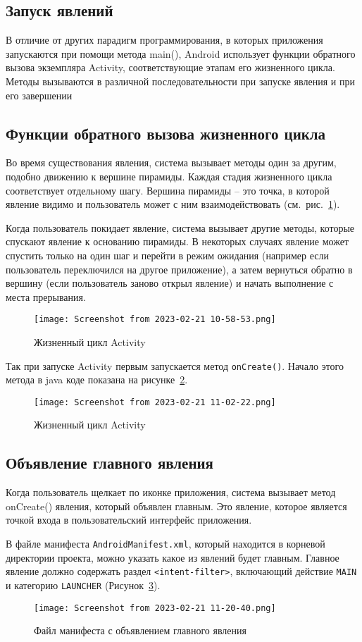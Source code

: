 \subsection{Запуск явлений}
В отличие от других парадигм программирования, в которых приложения
запускаются при помощи метода main(), Android использует функции
обратного вызова экземпляра Activity, соответствующие этапам его
жизненного цикла. Методы вызываются в различной последовательности при
запуске явления и при его завершении

\subsection{Функции обратного вызова жизненного цикла}
Во время существования явления, система вызывает методы один за другим,
подобно движению к вершине пирамиды. Каждая стадия жизненного цикла
соответствует отдельному шагу. Вершина пирамиды – это точка, в которой
явление видимо и пользователь может с ним взаимодействовать
(см.~рис.~\ref{fig:activity:ll}).\par
Когда пользователь покидает явление, система вызывает другие методы,
которые спускают явление к основанию пирамиды. В некоторых случаях
явление может спустить только на один шаг и перейти в режим ожидания
(например если пользователь переключился на другое приложение), а затем
вернуться обратно в вершину (если пользователь заново открыл явление) и
начать выполнение с места прерывания.
\begin{figure}[h!tp]
	\centering
	\texttt{[image: Screenshot from 2023-02-21 10-58-53.png]}
	\caption{Жизненный цикл Activity}
	\label{fig:activity:ll}
\end{figure}

Так при запуске Activity первым запускается метод \texttt{onCreate()}.
Начало этого метода в java коде показана
на рисунке~\ref{fig:activity:onCreate}.
\begin{figure}[h!tp]
	\centering
	\texttt{[image: Screenshot from 2023-02-21 11-02-22.png]}
	\caption{Жизненный цикл Activity}
	\label{fig:activity:onCreate}
\end{figure}

\subsection{Объявление главного явления}
Когда пользователь щелкает по иконке приложения, система
вызывает метод onCreate() явления, который объявлен главным. Это
явление, которое является точкой входа в пользовательский интерфейс
приложения.\par
В файле манифеста \texttt{AndroidManifest.xml}, который находится в корневой
директории проекта, можно указать какое из явлений будет главным.
Главное явление должно содержать раздел \texttt{<intent-filter>},
включающий действие \texttt{MAIN} и категорию \texttt{LAUNCHER}
(Рисунок~\ref{fig:manifest:MAIN}).
\begin{figure}[h!tp]
	\centering
	\texttt{[image: Screenshot from 2023-02-21 11-20-40.png]}
	\caption{Файл манифеста с объявлением главного явления}
	\label{fig:manifest:MAIN}
\end{figure}

